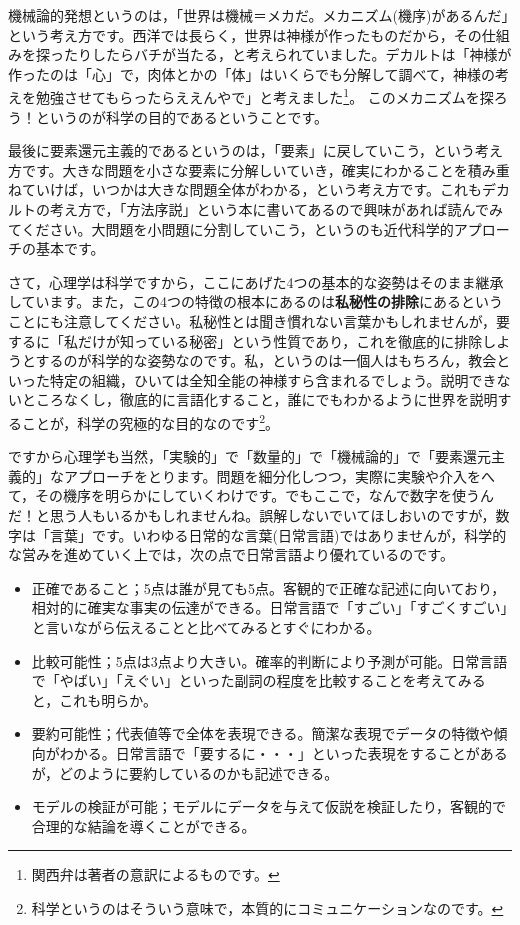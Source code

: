 \documentclass{ltjsbook}
\begin{document}
機械論的発想というのは，「世界は機械＝メカだ。メカニズム(機序)があるんだ」という考え方です。西洋では長らく，世界は神様が作ったものだから，その仕組みを探ったりしたらバチが当たる，と考えられていました。デカルトは「神様が作ったのは「心」で，肉体とかの「体」はいくらでも分解して調べて，神様の考えを勉強させてもらったらええんやで」と考えました\footnote{関西弁は著者の意訳によるものです。}。
このメカニズムを探ろう！というのが科学の目的であるということです。

最後に要素還元主義的であるというのは，「要素」に戻していこう，という考え方です。大きな問題を小さな要素に分解しいていき，確実にわかることを積み重ねていけば，いつかは大きな問題全体がわかる，という考え方です。これもデカルトの考え方で，「方法序説」という本に書いてあるので興味があれば読んでみてください\citep{デカルト1997}。大問題を小問題に分割していこう，というのも近代科学的アプローチの基本です。

さて，心理学は科学ですから，ここにあげた4つの基本的な姿勢はそのまま継承しています。また，この4つの特徴の根本にあるのは\textbf{私秘性の排除}にあるということにも注意してください。私秘性とは聞き慣れない言葉かもしれませんが，要するに「私だけが知っている秘密」という性質であり，これを徹底的に排除しようとするのが科学的な姿勢なのです。私，というのは一個人はもちろん，教会といった特定の組織，ひいては全知全能の神様すら含まれるでしょう。説明できないところなくし，徹底的に言語化すること，誰にでもわかるように世界を説明することが，科学の究極的な目的なのです\footnote{科学というのはそういう意味で，本質的にコミュニケーションなのです。}。

ですから心理学も当然，「実験的」で「数量的」で「機械論的」で「要素還元主義的」なアプローチをとります。問題を細分化しつつ，実際に実験や介入をへて，その機序を明らかにしていくわけです。でもここで，なんで数字を使うんだ！と思う人もいるかもしれませんね。誤解しないでいてほしおいのですが，数字は「言葉」です。いわゆる日常的な言葉(日常言語)ではありませんが，科学的な営みを進めていく上では，次の点で日常言語より優れているのです。

\begin{itemize}
    \item 正確であること；5点は誰が見ても5点。客観的で正確な記述に向いており，相対的に確実な事実の伝達ができる。日常言語で「すごい」「すごくすごい」と言いながら伝えることと比べてみるとすぐにわかる。
    \item 比較可能性；5点は3点より大きい。確率的判断により予測が可能。日常言語で「やばい」「えぐい」といった副詞の程度を比較することを考えてみると，これも明らか。
    \item 要約可能性；代表値等で全体を表現できる。簡潔な表現でデータの特徴や傾向がわかる。日常言語で「要するに・・・」といった表現をすることがあるが，どのように要約しているのかも記述できる。
    \item モデルの検証が可能；モデルにデータを与えて仮説を検証したり，客観的で合理的な結論を導くことができる。
\end{itemize}
\end{document}
